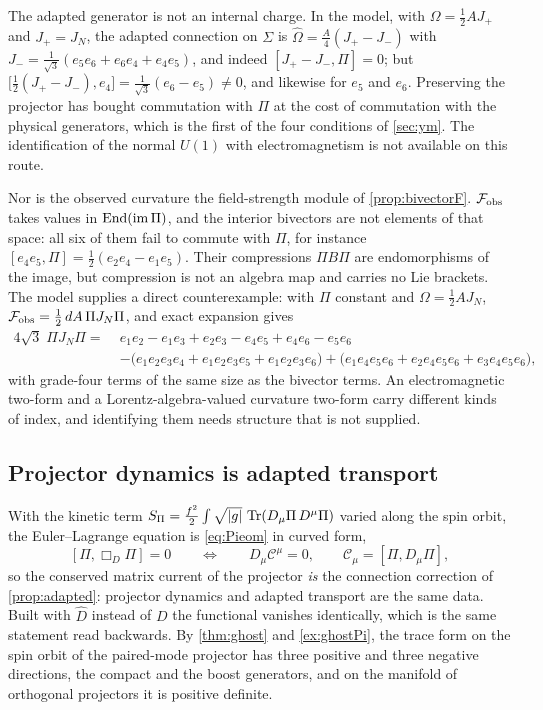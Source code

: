 The adapted generator is not an internal charge. In the model, with $\Omega=\tfrac12AJ_+$ and $J_+=J_N$, the adapted connection on $\Sigma$ is
$\widehat\Omega=\tfrac A4(J_+-J_-)$ with $J_-=\tfrac1{\sqrt3}(e_5e_6+e_6e_4+e_4e_5)$, and indeed $[J_+-J_-,\Pi]=0$; but $\bigl[\tfrac12(J_+-J_-),e_4\bigr]=\tfrac1{\sqrt3}(e_6-e_5)\neq0$,
and likewise for $e_5$ and $e_6$. Preserving the projector has bought commutation with $\Pi$ at the cost of commutation with the physical generators, which is the
first of the four conditions of \cref{sec:ym}. The identification of the normal $U(1)$ with electromagnetism is not available on this route.

Nor is the observed curvature the field-strength module of \cref{prop:bivectorF}. $\mathcal F_{\rm obs}$ takes values in $\operatorname{End}(\operatorname{im}\Pi)$, and the interior
bivectors are not elements of that space: all six of them fail to commute with $\Pi$, for instance $[e_4e_5,\Pi]=\tfrac12(e_2e_4-e_1e_5)$. Their compressions $\Pi B\Pi$
are endomorphisms of the image, but compression is not an algebra map and carries no Lie brackets. The model supplies a direct counterexample: with $\Pi$
constant and $\Omega=\tfrac12AJ_N$, $\mathcal F_{\rm obs}=\tfrac12\,dA\,\Pi J_N\Pi$, and exact expansion gives
\[
\begin{aligned}
4\sqrt3\;\Pi J_N\Pi=\;&e_1e_2-e_1e_3+e_2e_3-e_4e_5+e_4e_6-e_5e_6\\
&-\bigl(e_1e_2e_3e_4+e_1e_2e_3e_5+e_1e_2e_3e_6\bigr)+\bigl(e_1e_4e_5e_6+e_2e_4e_5e_6+e_3e_4e_5e_6\bigr),
\end{aligned}
\]
with grade-four terms of the same size as the bivector terms. An electromagnetic two-form and a Lorentz-algebra-valued curvature two-form carry different
kinds of index, and identifying them needs structure that is not supplied.

\subsection{Projector dynamics is adapted transport}

With the kinetic term $S_\Pi=\tfrac{f^2}2\int\sqrt{|g|}\,\operatorname{Tr}(D_\mu\Pi\,D^\mu\Pi)$ varied along the spin orbit, the Euler--Lagrange equation is \eqref{eq:Pieom} in
curved form,
\[
[\Pi,\Box_D\Pi]=0\qquad\Longleftrightarrow\qquad D_\mu\mathcal C^\mu=0,\qquad \mathcal C_\mu=[\Pi,D_\mu\Pi],
\]
so the conserved matrix current of the projector \emph{is} the connection correction of \cref{prop:adapted}: projector dynamics and adapted transport are the same
data. Built with $\widehat D$ instead of $D$ the functional vanishes identically, which is the same statement read backwards. By \cref{thm:ghost} and
\cref{ex:ghostPi}, the trace form on the spin orbit of the paired-mode projector has three positive and three negative directions, the compact and the boost
generators, and on the manifold of orthogonal projectors it is positive definite.

